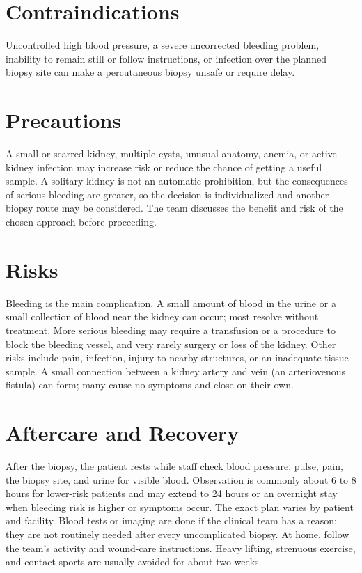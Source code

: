 \section*{Contraindications}
Uncontrolled high blood pressure, a severe uncorrected bleeding problem, inability to remain still or follow instructions, or infection over the planned biopsy site can make a percutaneous biopsy unsafe or require delay.

\section*{Precautions}
A small or scarred kidney, multiple cysts, unusual anatomy, anemia, or active kidney infection may increase risk or reduce the chance of getting a useful sample. A solitary kidney is not an automatic prohibition, but the consequences of serious bleeding are greater, so the decision is individualized and another biopsy route may be considered. The team discusses the benefit and risk of the chosen approach before proceeding.

\section*{Risks}
Bleeding is the main complication. A small amount of blood in the urine or a small collection of blood near the kidney can occur; most resolve without treatment. More serious bleeding may require a transfusion or a procedure to block the bleeding vessel, and very rarely surgery or loss of the kidney. Other risks include pain, infection, injury to nearby structures, or an inadequate tissue sample. A small connection between a kidney artery and vein (an arteriovenous fistula) can form; many cause no symptoms and close on their own.

\section*{Aftercare and Recovery}
After the biopsy, the patient rests while staff check blood pressure, pulse, pain, the biopsy site, and urine for visible blood. Observation is commonly about 6 to 8 hours for lower-risk patients and may extend to 24 hours or an overnight stay when bleeding risk is higher or symptoms occur. The exact plan varies by patient and facility. Blood tests or imaging are done if the clinical team has a reason; they are not routinely needed after every uncomplicated biopsy. At home, follow the team's activity and wound-care instructions. Heavy lifting, strenuous exercise, and contact sports are usually avoided for about two weeks.


